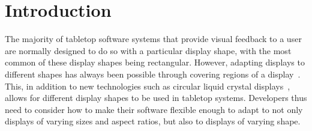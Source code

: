\documentclass{bmcart}
\begin{document}
\begin{frontmatter}
\begin{abstractbox}

\begin{keyword}
\end{keyword}


\end{abstractbox}
%

\end{frontmatter}




\section*{Introduction}
\label{sec:intro}

The majority of tabletop software systems that provide visual feedback to a user are normally designed to do so with a particular display shape, with the most common of these display shapes being rectangular.
However, adapting displays to different shapes has always been possible through covering regions of a display~\cite{Dietz2004}.
This, in addition to new technologies such as circular liquid crystal displays~\cite{Boyd2007,Finney2009}, allows for different display shapes to be used in tabletop systems. 
Developers thus need to consider how to make their software flexible enough to adapt to not only displays of varying sizes and aspect ratios, but also to displays of varying shape.
\end{document}
